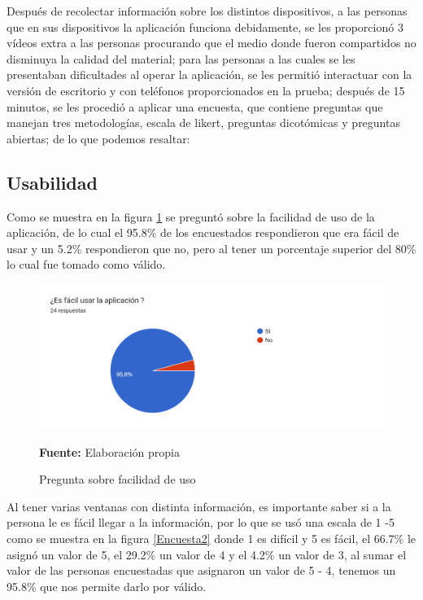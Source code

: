 \documentclass[12pt,twocolumn,a4paper]{article}
\begin{document}
Después de recolectar información sobre los distintos dispositivos, a las personas que en sus dispositivos la aplicación funciona debidamente, se les proporcionó 3 vídeos extra a  las personas procurando que el medio donde fueron compartidos no disminuya la calidad del material; para las personas a las cuales se les presentaban dificultades al operar la aplicación, se les permitió interactuar con la versión de escritorio y con teléfonos proporcionados en la prueba; después de  15 minutos, se les procedió a aplicar una encuesta, que contiene preguntas  que manejan tres metodologías, escala de likert, preguntas dicotómicas y preguntas abiertas; de lo que podemos resaltar:

\subsection{Usabilidad}

Como se muestra en la figura \ref{Encuesta1} se preguntó sobre la facilidad de uso de la aplicación, de lo cual el 95.8\% de los encuestados respondieron que era fácil de usar y un 5.2\% respondieron que no, pero al tener un porcentaje superior del 80\% lo cual fue tomado como válido.

\begin{figure}[h!]
	\centering
	\includegraphics[scale=0.2]{Encuesta1.png}
	\caption{Pregunta sobre facilidad de uso} \textbf{Fuente:} Elaboración propia 
	\label{Encuesta1}
\end{figure}


Al tener varias ventanas con distinta información, es importante saber si a la persona le es fácil llegar a la información, por lo que se usó una escala de 1 -5 como se muestra en la figura \ref{Encuesta2}  donde 1 es difícil y 5 es fácil, el 66.7\% le asignó un valor de 5, el 29.2\% un valor de 4 y el 4.2\% un valor de 3, al sumar el valor de las personas encuestadas que asignaron un valor de 5 - 4, tenemos un 95.8\% que nos permite darlo por válido. 
\end{document}
